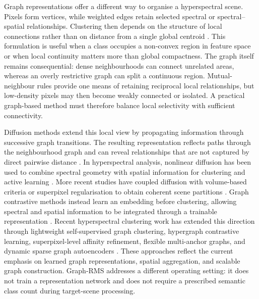 \documentclass[10pt,a4paper,fleqn]{article}
\begin{document}
Graph representations offer a different way to organise a hyperspectral scene.
Pixels form vertices, while weighted edges retain selected spectral or
spectral--spatial relationships. Clustering then depends on the structure of
local connections rather than on distance from a single global centroid
\citep{vonluxburg2007}. This formulation is useful when a class occupies a
non-convex region in feature space or when local continuity matters more than
global compactness. The graph itself remains consequential: dense neighbourhoods
can connect unrelated areas, whereas an overly restrictive graph can split a
continuous region. Mutual-neighbour rules provide one means of retaining
reciprocal local relationships, but low-density pixels may then become weakly
connected or isolated. A practical graph-based method must therefore balance
local selectivity with sufficient connectivity.

Diffusion methods extend this local view by propagating information through
successive graph transitions. The resulting representation reflects paths
through the neighbourhood graph and can reveal relationships that are not
captured by direct pairwise distance \citep{coifman2006}. In hyperspectral
analysis, nonlinear diffusion has been used to combine spectral geometry with
spatial information for clustering and active learning \citep{murphy2019}.
More recent studies have coupled diffusion with volume-based criteria or
superpixel regularisation to obtain coherent scene partitions
\citep{polk2023,cui2024}. Graph contrastive methods instead learn an embedding
before clustering, allowing spectral and spatial information to be integrated
through a trainable representation \citep{guan2024}. Recent hyperspectral
clustering work has extended this direction through lightweight
self-supervised graph clustering, hypergraph contrastive learning,
superpixel-level affinity refinement, flexible multi-anchor graphs, and
dynamic sparse graph autoencoders
\citep{ding2025slcgc,yao2025hypergraph,qin2025evolving,
li2025multianchor,liang2026dsgc}. These approaches reflect the current
emphasis on learned graph representations, spatial aggregation, and scalable
graph construction. Graph-RMS addresses a different operating setting: it
does not train a representation network and does not require a prescribed
semantic class count during target-scene processing.
\end{document}
